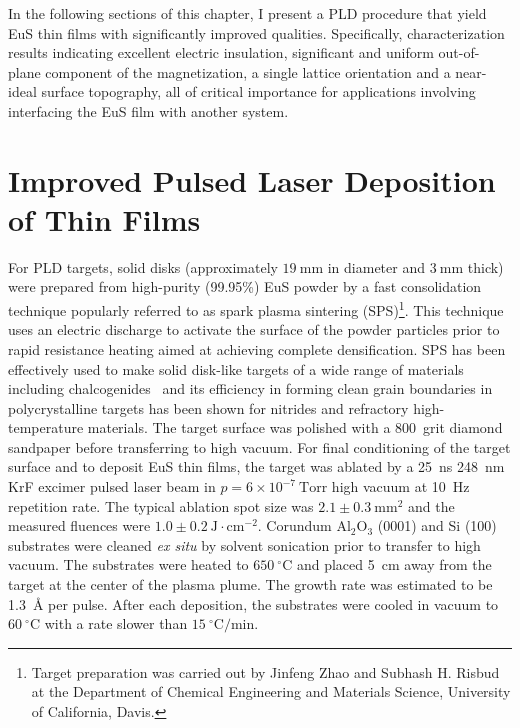 In the following sections of this chapter, I present a PLD procedure that yield EuS thin films with significantly improved qualities. Specifically, characterization results indicating excellent electric insulation, significant and uniform out-of-plane component of the magnetization, a single lattice orientation and a near-ideal surface topography, all of critical importance for applications involving interfacing the EuS film with another system.

\section{Improved Pulsed Laser Deposition of Thin Films}
For PLD targets, solid disks (approximately $19~\mathrm{mm}$ in diameter and $3~\mathrm{mm}$ thick) were prepared from high-purity (99.95\%) EuS powder by a fast consolidation technique popularly referred to as spark plasma sintering (SPS)\footnote{Target preparation was carried out by Jinfeng Zhao and Subhash H. Risbud at the Department of Chemical Engineering and Materials Science, University of California, Davis.}. This technique uses an electric discharge to activate the surface of the powder particles prior to rapid resistance heating aimed at achieving complete densification. SPS has been effectively used to make solid disk-like targets of a wide range of materials including chalcogenides~\cite{Jinfeng2, Subhash1} and its efficiency in forming clean grain boundaries in polycrystalline targets has been shown for nitrides and refractory high-temperature materials.\cite{Subhash2, Jinfeng1} The target surface was polished with a 800~grit diamond sandpaper before transferring to high vacuum. For final conditioning of the target surface and to deposit EuS thin films, the target was ablated by a 25~ns 248~nm KrF excimer pulsed laser beam in $p=6\times{}10^{-7}~\mathrm{Torr}$ high vacuum at 10~Hz repetition rate. The typical ablation spot size was $2.1\pm0.3~\mathrm{mm^2}$ and the measured fluences were $1.0\pm0.2~\mathrm{J\cdot{}cm^{-2}}$. Corundum Al$_2$O$_3$ (0001) and Si (100) substrates were cleaned \textit{ex situ} by solvent sonication prior to transfer to high vacuum. The substrates were heated to $650~^{\circ}\mathrm{C}$ and placed 5~cm away from the target at the center of the plasma plume. The growth rate was estimated to be 1.3~\AA{} per pulse. After each deposition, the substrates were cooled in vacuum to $60~^{\circ}\mathrm{C}$ with a rate slower than $15~^{\circ}\mathrm{C}/\mathrm{min}$.

